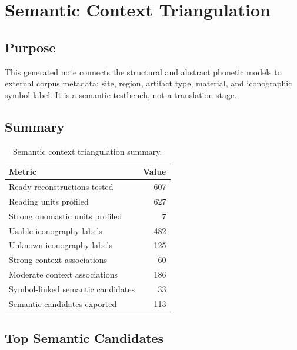 \section{Semantic Context Triangulation}

\subsection{Purpose}

This generated note connects the structural and abstract phonetic models to external corpus metadata: site, region, artifact type, material, and iconographic symbol label. It is a semantic testbench, not a translation stage.

\subsection{Summary}

\begin{table}[htbp]
\centering
\begin{tabular}{p{}r}
\toprule
\textbf{Metric} & \textbf{Value} \\
\midrule
Ready reconstructions tested & 607 \\
Reading units profiled & 627 \\
Strong onomastic units profiled & 7 \\
Usable iconography labels & 482 \\
Unknown iconography labels & 125 \\
Strong context associations & 60 \\
Moderate context associations & 186 \\
Symbol-linked semantic candidates & 33 \\
Semantic candidates exported & 113 \\
\bottomrule
\end{tabular}
\caption{Semantic context triangulation summary.}
\end{table}

\subsection{Top Semantic Candidates}

